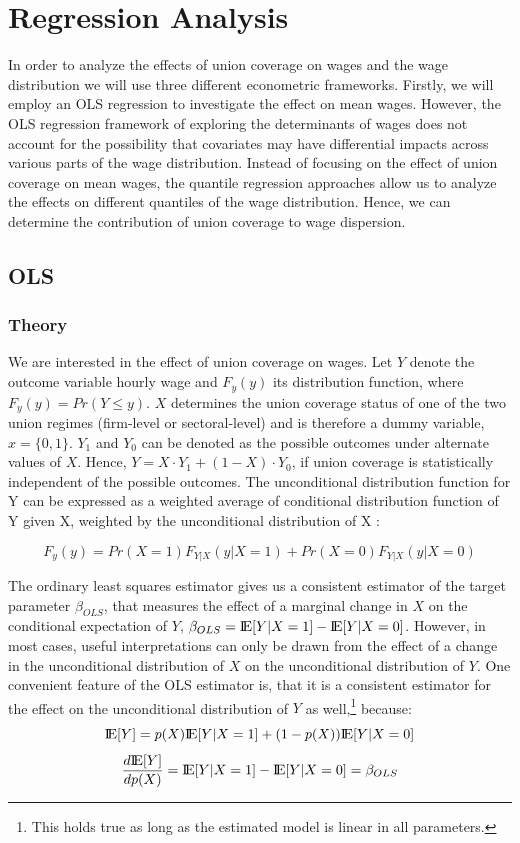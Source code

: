 \section{Regression Analysis}\label{Sec:regressionR}
In order to analyze the effects of union coverage on wages and the wage distribution we will use three different econometric frameworks. Firstly, we will employ an OLS regression to investigate the effect on mean wages. However, the OLS regression framework of exploring the determinants of wages does not account for the possibility that covariates may have differential impacts across various parts of the wage distribution. Instead of focusing on the effect of union coverage on mean wages, the quantile regression approaches allow us to analyze the effects on different quantiles of the wage distribution. Hence, we can determine the contribution of union coverage to wage dispersion.

\subsection{OLS}
\subsubsection*{Theory}
We are interested in the effect of union coverage on wages. Let $ Y $ denote the outcome variable hourly wage and $ F_y(y) $ its distribution function, where $ F_y(y)=Pr(Y\leq y) $. $ X $ determines the union coverage status of one of the two union regimes (firm-level or sectoral-level) and is therefore a dummy variable, $ x= \{0,1\}$. $ Y_1 $ and $ Y_0 $ can be denoted as the possible outcomes under alternate values of $ X $. Hence, $Y=X\cdot Y_1 + (1-X)\cdot Y_0$, if union coverage is statistically independent of the possible outcomes. The unconditional distribution function for Y can be expressed as a weighted average of conditional distribution function of Y given X, weighted by the unconditional distribution of X \citep{Borah&Basu:2013}:

\begin{equation}\label{1}
  F_{y}(y)=Pr(X=1)F_{Y|X}(y|X=1) + Pr(X=0)F_{Y|X}(y|X=0)
\end{equation}

The ordinary least squares estimator gives us a consistent estimator of the target parameter $\beta_{OLS}$, that measures the effect of a marginal change in $X$ on the conditional expectation of $Y$, $\beta_{OLS}=\mbox{I\negthinspace E}[Y|X=1]-\mbox{I\negthinspace E}[Y|X=0]$. However, in most cases, useful interpretations can only be drawn from the effect of a change in the unconditional distribution of $X$ on the unconditional distribution of $Y$. One convenient feature of the OLS estimator is, that it is a consistent estimator for the effect on the unconditional distribution of $Y$ as well,\footnote{ This holds true as long as the estimated model is linear in all parameters.} because:
\begin{equation}\label{2}
  \mbox{I\negthinspace E} [Y]=p(X)\mbox{I\negthinspace E}[Y|X=1]+(1-p(X))\mbox{I\negthinspace E}[Y|X=0]
\end{equation}
\begin{equation*}
  \frac{d\mbox{I\negthinspace E}[Y]}{dp(X)}=\mbox{I\negthinspace E}[Y|X=1]- \mbox{I\negthinspace E}[Y|X=0]=\beta_{OLS}
\end{equation*}

